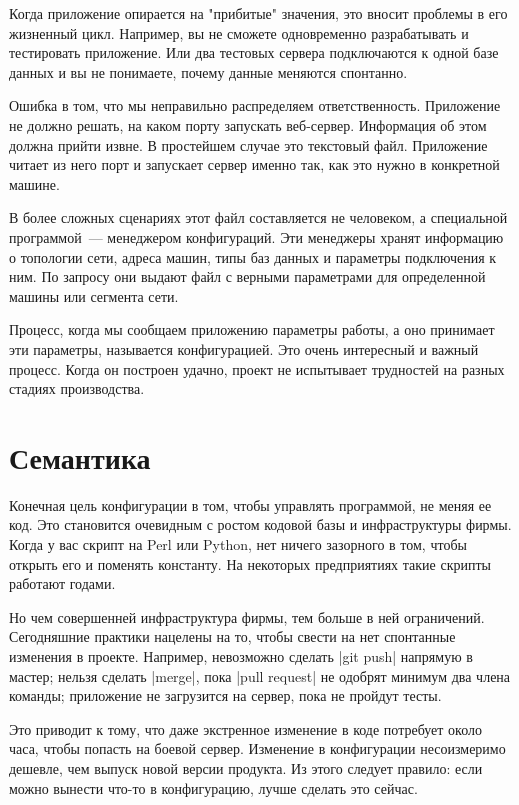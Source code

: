 Когда приложение опирается на "прибитые" значения, это вносит проблемы в его
жизненный цикл. Например, вы не сможете одновременно разрабатывать и тестировать
приложение. Или два тестовых сервера подключаются к одной базе данных и вы не
понимаете, почему данные меняются спонтанно.

Ошибка в том, что мы неправильно распределяем ответственность. Приложение не
должно решать, на каком порту запускать веб-сервер. Информация об этом должна
прийти извне. В простейшем случае это текстовый файл. Приложение читает из него
порт и запускает сервер именно так, как это нужно в конкретной машине.

В более сложных сценариях этот файл составляется не человеком, а специальной
программой~--- менеджером конфигураций. Эти менеджеры хранят информацию о
топологии сети, адреса машин, типы баз данных и параметры подключения к ним. По
запросу они выдают файл с верными параметрами для определенной машины или
сегмента сети.

Процесс, когда мы сообщаем приложению параметры работы, а оно принимает эти
параметры, называется конфигурацией. Это очень интересный и важный
процесс. Когда он построен удачно, проект не испытывает трудностей на разных
стадиях производства.

\section{Семантика}

Конечная цель конфигурации в том, чтобы управлять программой, не меняя ее
код. Это становится очевидным с ростом кодовой базы и инфраструктуры
фирмы. Когда у вас скрипт на Perl или Python, нет ничего зазорного в том, чтобы
открыть его и поменять константу. На некоторых предприятиях такие скрипты
работают годами.

Но чем совершенней инфраструктура фирмы, тем больше в ней
ограничений. Сегодняшние практики нацелены на то, чтобы свести на нет спонтанные
изменения в проекте. Например, невозможно сделать \spverb|git push| напрямую в
мастер; нельзя сделать \spverb|merge|, пока \spverb|pull request| не одобрят
минимум два члена команды; приложение не загрузится на сервер, пока не пройдут
тесты.

Это приводит к тому, что даже экстренное изменение в коде потребует около часа,
чтобы попасть на боевой сервер. Изменение в конфигурации несоизмеримо дешевле,
чем выпуск новой версии продукта. Из этого следует правило: если можно вынести
что-то в конфигурацию, лучше сделать это сейчас.

